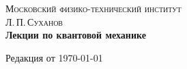 \frontmatter

\begin{titlepage}
\center

\textsc{\large Московский физико-технический институт}\\[1cm]
\textsc{\Large Л.\,П.\,Суханов}\\[6cm]

{ \Huge \bfseries Лекции по квантовой механике}\\[0.4cm]

\vfill

{\large Редакция от \today}
\end{titlepage}

\clearpage\thispagestyle{empty}

\tableofcontents

%
%

